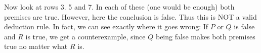 \documentclass[10pt]{exam}
\begin{document}
\begin{questions}
\begin{solution}
\begin{parts}
      Now look at rows 3. 5 and 7.  In each of these (one would be enough) both premises are true.  However, here the conclusion is false.  Thus this is NOT a valid deduction rule.  In fact, we can see exactly where it goes wrong: If $P$ or $Q$ is false and $R$ is true, we get a counterexample, since $Q$ being false makes both premises true no matter what $R$ is.
  \end{parts}
\end{solution}



\end{questions}
\end{document}
